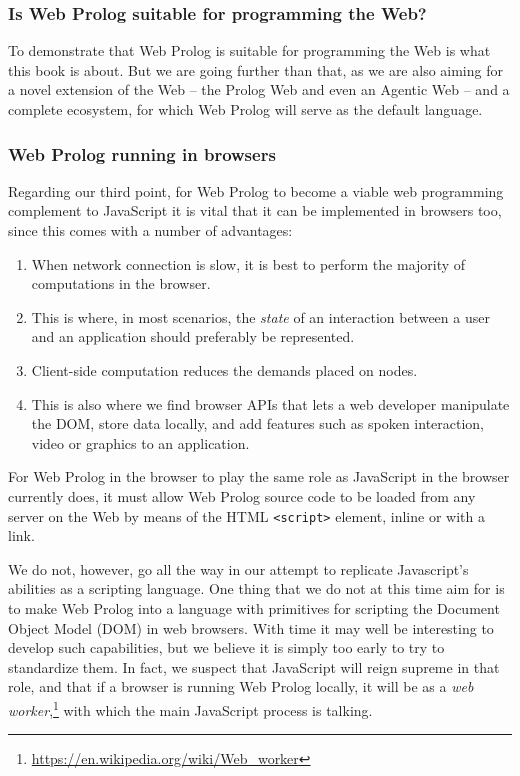 \subsubsection{Is Web Prolog suitable for programming the Web?}\label{sec:wp-suitable-for-web}

To demonstrate that Web Prolog is suitable for programming the Web is what this book is about. But we are going further than that, as we are also aiming for a novel extension of the Web -- the Prolog Web and even an Agentic Web -- and a complete ecosystem, for which Web Prolog will serve as the default language.

\subsubsection{Web Prolog running in browsers}\label{sec:web-prolog-running-in-browsers}

Regarding our third point, for Web Prolog to become a viable web programming complement to JavaScript it is vital that it can be implemented in browsers too, since this comes with a number of advantages:

\begin{enumerate}

\item When network connection is slow, it is best to perform the majority of computations in the browser.

\item This is where, in most scenarios, the \textit{state} of an interaction between a user and an application should preferably be represented.

\item Client-side computation reduces the demands placed on nodes.

\item This is also where we find browser APIs that lets a web developer manipulate the DOM, store data locally, and add features such as spoken interaction, video or graphics to an application.

\end{enumerate}

\noindent For Web Prolog in the browser to play the same role as JavaScript in the browser currently does, it must allow Web Prolog source code to be loaded from any server on the Web by means of the HTML \texttt{<script>} element, inline or with a link. 

We do not, however, go all the way in our attempt to replicate Javascript's abilities as a scripting language. One thing that we do not at this time aim for is to make Web Prolog into a language with primitives for scripting the Document Object Model (DOM) in web browsers. With time it may well be interesting to develop such capabilities, but we believe it is simply too early to try to standardize them. In fact, we suspect that JavaScript will reign supreme in that role, and that if a browser is running Web Prolog locally, it will be as a \textit{web worker},\footnote{\url{https://en.wikipedia.org/wiki/Web\_worker}} with which the main JavaScript process is talking.

